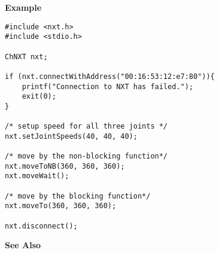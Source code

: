 \noindent
{\bf Example}
\begin{verbatim}
#include <nxt.h> 
#include <stdio.h>

ChNXT nxt;

if (nxt.connectWithAddress("00:16:53:12:e7:80")){
    printf("Connection to NXT has failed.");
    exit(0);
}
 
/* setup speed for all three joints */
nxt.setJointSpeeds(40, 40, 40);

/* move by the non-blocking function*/
nxt.moveToNB(360, 360, 360);
nxt.moveWait();

/* move by the blocking function*/
nxt.moveTo(360, 360, 360);

nxt.disconnect();
\end{verbatim}

\noindent
{\bf See Also}\\
